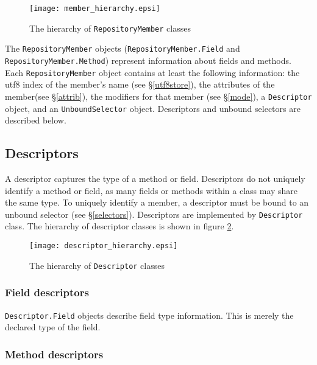 \documentclass{report}
\begin{document}
\begin{figure}[htb]
\begin{center}
\texttt{[image: member\_hierarchy.epsi]}
\caption{The hierarchy of \texttt{RepositoryMember} classes}
\label{member_graphic}
\end{center}
\end{figure}

The \texttt{RepositoryMember} objects 
(\texttt{Re\-pos\-i\-tory\-Mem\-ber.Field} and 
\texttt{Repository\-Member.Meth\-od}) represent information about 
fields and methods. Each \texttt{Re\-pos\-i\-tor\-y\-Mem\-ber}
object contains at least the following information: the
utf8 index of the member's name (see \S \ref{utf8store}), the
attributes of the member(see \S \ref{attrib}), the modifiers for
that member (see \S \ref{mode}), a \texttt{Descriptor} object,
and an \texttt{Un\-bound\-Se\-lec\-tor} object. 
Descriptors and unbound selectors are described below.

\subsection{Descriptors}

A descriptor captures the type of a method or field.
Descriptors do not uniquely identify a method or field, as many
fields or methods within a class may share the same type. To
uniquely identify a member, a descriptor must be bound to an
unbound selector (see \S \ref{selectors}). Descriptors are
implemented by \texttt{Descriptor} class. The
hierarchy of descriptor classes is shown in figure \ref{desc_graphic}.

\begin{figure}[htb]
\begin{center}
\texttt{[image: descriptor\_hierarchy.epsi]}
\caption{The hierarchy of \texttt{Descriptor} classes}
\label{desc_graphic}
\end{center}
\end{figure}

\subsubsection{Field descriptors}

\texttt{Descriptor.Field} objects
describe field type information. This is merely the
declared type of the field.

\subsubsection{Method descriptors}
\end{document}
